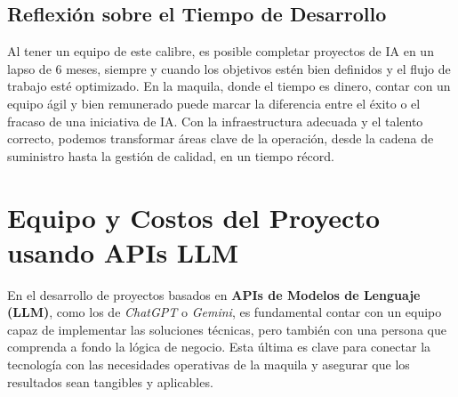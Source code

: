 \begin{table}[H]
\centering
\caption{Sueldos del Equipo de Data Science}
\end{table}

\subsection{Reflexión sobre el Tiempo de Desarrollo}

Al tener un equipo de este calibre, es posible completar proyectos de IA en un lapso de 6 meses, siempre y cuando los objetivos estén bien definidos y el flujo de trabajo esté optimizado. En la maquila, donde el tiempo es dinero, contar con un equipo ágil y bien remunerado puede marcar la diferencia entre el éxito o el fracaso de una iniciativa de IA. Con la infraestructura adecuada y el talento correcto, podemos transformar áreas clave de la operación, desde la cadena de suministro hasta la gestión de calidad, en un tiempo récord.

\section{Equipo y Costos del Proyecto usando APIs LLM}

En el desarrollo de proyectos basados en \textbf{APIs de Modelos de Lenguaje (LLM)}, como los de \textit{ChatGPT} o \textit{Gemini}, es fundamental contar con un equipo capaz de implementar las soluciones técnicas, pero también con una persona que comprenda a fondo la lógica de negocio. Esta última es clave para conectar la tecnología con las necesidades operativas de la maquila y asegurar que los resultados sean tangibles y aplicables. 

